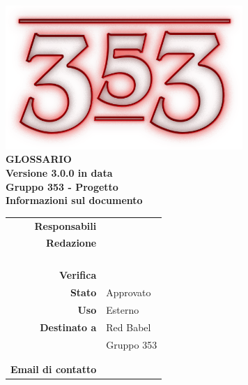 \documentclass[openany, a4paper, 12pt]{report}
\begin{document}
\begin{titlepage}
\centering
\vfill
{
	\bfseries
	\vskip2cm
	\includegraphics[width=9cm]{../../common/images/logo.png} \\
	\vfill
	\Huge{GLOSSARIO}\\
	\vfill
	\Large Versione 3.0.0 in data \\
	\large Gruppo 353 - Progetto \progetto \\
	\vfill
	\normalsize Informazioni sul documento\\
	\begin{table}[htbp]
		\centering
		\renewcommand\arraystretch{1.2}
		\begin{tabular}{r|l}
			\hline
			\textbf{Responsabili}	& \Valentina\\
			
			\textbf{Redazione} 		& \Parwinder \\
									& \Riccardo \\
									& \Mirco \\
									& \Elena \\
									& \Gianluca \\
			\textbf{Verifica} 		& \Davide \\	
			
			\textbf{Stato} 			& Approvato\\
			\textbf{Uso}			& Esterno\\
			\textbf{Destinato a}   	& Red Babel\\
									& Gruppo 353\\
									& \Vardanega\\
									& \Cardin\\
			
			\textbf{Email di contatto}	& \mailgroup
		\end{tabular}
	\end{table}
	\vfill 
}      
\end{titlepage}

\tableofcontents
{}
\printglossary[style=glossaryStyle, nonumberlist]
 
\end{document}
